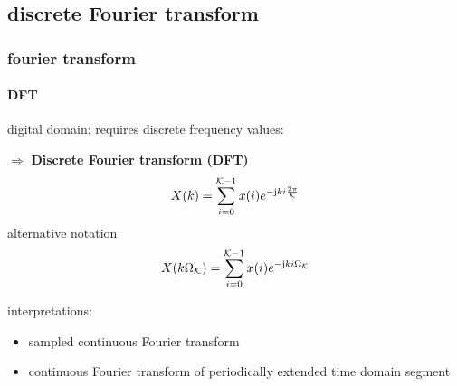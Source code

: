 \subsection{discrete Fourier transform}
	\begin{frame}\frametitle{fourier transform}\framesubtitle{DFT}
		digital domain: requires discrete frequency values:
		
		$\Rightarrow$ \textbf{Discrete Fourier transform (DFT)}
		\begin{equation}
			X(k) = \sum\limits_{i=0}^{\mathcal{K}-1}{x(i){e}^{-\mathrm{j}ki\frac{2\pi}{\mathcal{K}}}}
		\end{equation}
        \pause
        alternative notation
		\begin{equation}
			X(k\Omega_\mathcal{K}) = \sum\limits_{i=0}^{\mathcal{K}-1}{x(i){e}^{-\mathrm{j}ki\Omega_\mathcal{K}}}
		\end{equation}
		
		\pause
         interpretations:
		\begin{itemize}
			\item	sampled continuous Fourier transform
			\item	continuous Fourier transform of periodically extended time domain segment
		\end{itemize}
	\end{frame}	


